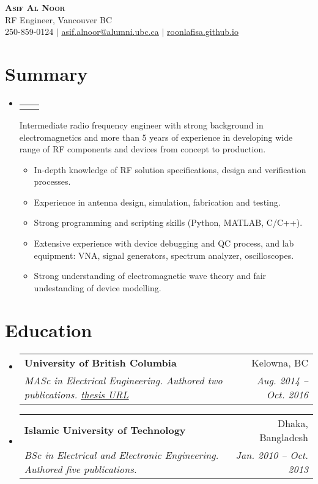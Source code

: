\documentclass[letterpaper,11pt]{article}
\makeatletter
\newcommand{\resumeItem}[1]{
  \item\small{
    {#1 \vspace{-2pt}}
  }
}
\newcommand{\resumeSubheading}[4]{
  \vspace{-2pt}\item
    \begin{tabular*}{0.97\textwidth}[t]{l@{\extracolsep{\fill}}r}
      \textbf{#1} & #2 \\
      \textit{\small#3} & \textit{\small #4} \\
    \end{tabular*}\vspace{-7pt}
}
\newcommand{\resumeProjectHeading}[2]{
    \item
    \begin{tabular*}{0.97\textwidth}{l@{\extracolsep{\fill}}r}
      \small#1 & #2 \\
    \end{tabular*}\vspace{-7pt}
}
\newcommand{\resumeSubHeadingListStart}{\begin{itemize}[leftmargin=0.15in, label={}]}
\newcommand{\resumeSubHeadingListEnd}{\end{itemize}}
\newcommand{\resumeItemListStart}{\begin{itemize}}
\newcommand{\resumeItemListEnd}{\end{itemize}\vspace{-5pt}}
\makeatother
\begin{document}


\begin{center}
    \textbf{\Huge \scshape Asif Al Noor} \\ \vspace{1pt}
     \small RF Engineer, Vancouver BC \\
    \small 250-859-0124 $|$ \href{mailto:asif.alnoor@alumni.ubc.ca}{\underline{asif.alnoor@alumni.ubc.ca}} $|$ 
    \href{https://roonlafisa.github.io/}{\underline{roonlafisa.github.io}}
\end{center}

\section{Summary}

\resumeSubHeadingListStart
    \resumeProjectHeading {}{}
    Intermediate radio frequency engineer with strong background in electromagnetics and more than 5 years of experience in developing wide range of RF components and devices from concept to production.
        \resumeItemListStart
        \resumeItem{In-depth knowledge of RF solution specifications, design and verification processes.}
        \resumeItem{Experience in antenna design, simulation, fabrication and testing.}
        \resumeItem{Strong programming and scripting skills (Python, MATLAB, C/C++).}
        \resumeItem{Extensive experience with device debugging and QC process, and lab equipment: VNA, signal generators, spectrum analyzer, oscilloscopes.}
        \resumeItem{Strong understanding of electromagnetic wave theory and fair undestanding of device modelling.}
        \resumeItemListEnd
\resumeSubHeadingListEnd
\section{Education}
  \resumeSubHeadingListStart
    \resumeSubheading
      {University of British Columbia}{Kelowna, BC}
      {MASc in Electrical Engineering. Authored two publications. \href{https://dx.doi.org/10.14288/1.0319322}{\underline{thesis URL}}}{Aug. 2014 -- Oct. 2016}
    \resumeSubheading
      {Islamic University of Technology}{Dhaka, Bangladesh}
      {BSc in Electrical and Electronic Engineering. Authored five publications.}{Jan. 2010 -- Oct. 2013}
  \resumeSubHeadingListEnd
\end{document}
